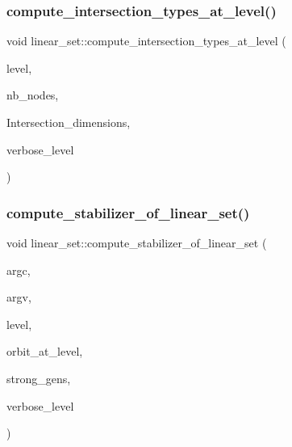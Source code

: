 \mbox{\label{classlinear__set_abcc3dd230b32c6923a756abab49f4c35}} 
\subsubsection{\texorpdfstring{compute\+\_\+intersection\+\_\+types\+\_\+at\+\_\+level()}{compute\_intersection\_types\_at\_level()}}
{\footnotesize\ttfamily void linear\+\_\+set\+::compute\+\_\+intersection\+\_\+types\+\_\+at\+\_\+level (\begin{DoxyParamCaption}\item[{\mbox{\hyperlink{galois_8h_a09fddde158a3a20bd2dcadb609de11dc}{I\+NT}}}]{level,  }\item[{\mbox{\hyperlink{galois_8h_a09fddde158a3a20bd2dcadb609de11dc}{I\+NT}} \&}]{nb\+\_\+nodes,  }\item[{\mbox{\hyperlink{galois_8h_a09fddde158a3a20bd2dcadb609de11dc}{I\+NT}} $\ast$\&}]{Intersection\+\_\+dimensions,  }\item[{\mbox{\hyperlink{galois_8h_a09fddde158a3a20bd2dcadb609de11dc}{I\+NT}}}]{verbose\+\_\+level }\end{DoxyParamCaption})}

\mbox{\label{classlinear__set_a098a133edfbaae0fd347a69c50bdbee2}} 
\subsubsection{\texorpdfstring{compute\+\_\+stabilizer\+\_\+of\+\_\+linear\+\_\+set()}{compute\_stabilizer\_of\_linear\_set()}}
{\footnotesize\ttfamily void linear\+\_\+set\+::compute\+\_\+stabilizer\+\_\+of\+\_\+linear\+\_\+set (\begin{DoxyParamCaption}\item[{int}]{argc,  }\item[{const char $\ast$$\ast$}]{argv,  }\item[{\mbox{\hyperlink{galois_8h_a09fddde158a3a20bd2dcadb609de11dc}{I\+NT}}}]{level,  }\item[{\mbox{\hyperlink{galois_8h_a09fddde158a3a20bd2dcadb609de11dc}{I\+NT}}}]{orbit\+\_\+at\+\_\+level,  }\item[{\mbox{\hyperlink{classstrong__generators}{strong\+\_\+generators}} $\ast$\&}]{strong\+\_\+gens,  }\item[{\mbox{\hyperlink{galois_8h_a09fddde158a3a20bd2dcadb609de11dc}{I\+NT}}}]{verbose\+\_\+level }\end{DoxyParamCaption})}

